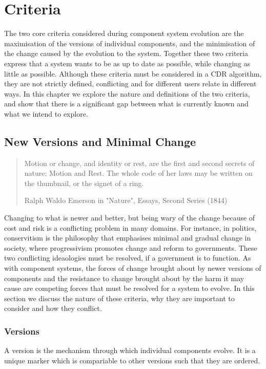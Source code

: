 \chapter{Criteria}
{}The two core criteria considered during component system evolution are the maximisation of the versions of individual components, 
{}and the minimisation of the change caused by the evolution to the system.
{}Together these two criteria express that a system wants to be as up to date as possible, while changing as little as possible.
{}Although these criteria must be considered in a CDR algorithm,
{}they are not strictly defined, conflicting and for different users relate in different ways.
{}In this chapter we explore the nature and definitions of the two criteria,
{}and show that there is a significant gap between what is currently known and what we intend to explore. 


\section{New Versions and Minimal Change}
\begin{quotation}
Motion or change, and identity or rest, are the first and second secrets of nature: Motion and Rest. 
The whole code of her laws may be written on the thumbnail, or the signet of a ring.

Ralph Waldo Emerson in "Nature", Essays, Second Series (1844)
\end{quotation}

Changing to what is newer and better, but being wary of the change because of cost and risk is a conflicting problem in many domains.
For instance, in politics, conservitism is the philosophy that emphasises minimal and gradual change in society, %
where progressivism promotes change and reform to governments.
These two conflicting ideaologies must be resolved, if a government is to function. 
As with component systems, 
the forces of change brought about by newer versions of components and the resistance to change brought about by the harm it may cause
are competing forces that must be resolved for a system to evolve.
In this section we discuss the nature of these criteria, why they are important to consider and how they conflict.


\subsection{Versions}
A version is the mechanism through which individual components evolve.
It is a unique marker which is compariable to other versions such that they are ordered.

